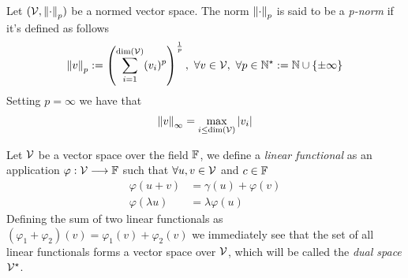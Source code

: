 \documentclass[../complete.tex]{subfiles}
\begin{document}
\begin{dfn}[p-norm]
	Let $(\mathcal{V},\norm{\cdot}_p)$ be a normed vector space. The norm $\norm{\cdot}_p$ is said to be a \textit{p-norm} if it's defined as follows
	\begin{equation}
		\norm{v}_p:=\left( \sum_{i=1}^{\dim(\mathcal{V})}(v_i)^p \right)^{\frac{1}{p}},\ \forall v\in\mathcal{V},\ \forall p\in\mathbb{N}^{\star}:=\mathbb{N}\cup\{\pm\infty\}
		\label{eq:pnorm}
	\end{equation}
	Setting $p=\infty$ we have that
	\begin{equation}
		\norm{v}_{\infty}=\max_{i\le\dim(\mathcal{V})}\abs{v_i}
		\label{eq:inftynorm}
	\end{equation}
\end{dfn}
\begin{dfn}
	Let $\mathcal{V}$ be a vector space over the field $\mathbb{F}$, we define a \textit{linear functional} as an application $\varphi:\mathcal{V}\overset{}{\longrightarrow}\mathbb{F}$ such that $\forall u,v\in\mathcal{V}$ and $c\in\mathbb{F}$
	\begin{equation}
		\begin{aligned}
			\varphi(u+v)&=\gamma(u)+\varphi(v)\\
			\varphi(\lambda u)&=\lambda\varphi(u)
		\end{aligned}
		\label{eq:linearfunctional}
	\end{equation}
	Defining the sum of two linear functionals as $(\varphi_1+\varphi_2)(v)=\varphi_1(v)+\varphi_2(v)$ we immediately see that the set of all linear functionals forms a vector space over $\mathcal{V}$, which will be called the \textit{dual space} $\mathcal{V}^\star$.
\end{dfn}
\end{document}
